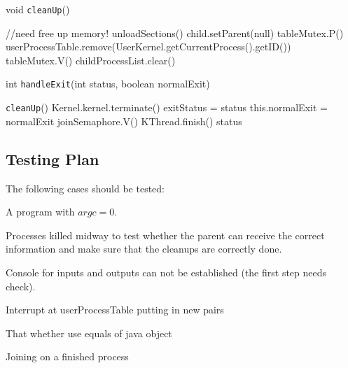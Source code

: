 \documentclass{article}
\begin{document}
\begin{spacing}{1.1}
\begin{algorithm}[htbp]
\label{alg:cleanUp}
\caption{void \texttt{cleanUp}()}
  \begin{algorithmic}
    \EndIf
    \EndFor
    \State \colorbox{myyellow}{//need free up memory!}
    \State unloadSections()
      \State child.setParent(null)
    \EndIf
    \EndFor
    \State \colorbox{myyellow}{tableMutex.P()}
    \State userProcessTable.remove(UserKernel.getCurrentProcess().getID())
    \State \colorbox{myyellow}{tableMutex.V()}
    \State childProcessList.clear()
  \end{algorithmic}
\end{algorithm}

\begin{algorithm}[htbp]
\label{alg:handleExit}
\caption{int \texttt{handleExit}(int status, boolean normalExit)}
  \begin{algorithmic}
    \State \texttt{cleanUp}()
      \State Kernel.kernel.terminate()
    \EndIf
    \State exitStatus = status
    \State this.normalExit = normalExit
    \State joinSemaphore.V()
    \State \colorbox{myyellow}{KThread.finish()}
    \Return status
  \end{algorithmic}
\end{algorithm}

\subsection{Testing Plan}
The following cases should be tested:
\begin{asparaitem}
  \item A program with $argc=0$.
  \item Processes killed midway to test whether the parent can receive the correct information and make sure that the cleanups are correctly done.
  \item Console for inputs and outputs can not be established (the first step needs check).
  \item Interrupt at userProcessTable putting in new pairs
  \item That whether use equals of java object
  \item Joining on a finished process
\end{asparaitem}



\end{spacing}
\end{document}
